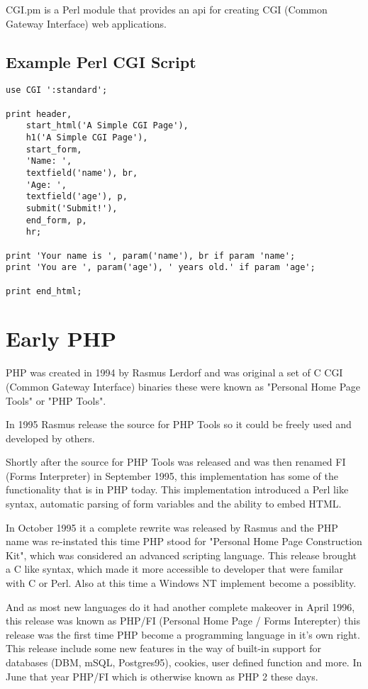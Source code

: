 \documentclass{book}
\begin{document}
CGI.pm is a Perl module that provides an api for creating CGI (Common Gateway Interface) web applications.

\subsection{Example Perl CGI Script}
\begin{lstlisting}
use CGI ':standard';
 
print header,
    start_html('A Simple CGI Page'),
    h1('A Simple CGI Page'),
    start_form,
    'Name: ',
    textfield('name'), br,
    'Age: ',
    textfield('age'), p,
    submit('Submit!'),
    end_form, p,
    hr;
 
print 'Your name is ', param('name'), br if param 'name';
print 'You are ', param('age'), ' years old.' if param 'age';
 
print end_html;

\end{lstlisting}

\section{Early PHP}
PHP was created in 1994 by Rasmus Lerdorf and was original a set of C CGI (Common Gateway Interface) binaries these were known as "Personal Home Page Tools" or "PHP Tools".

In 1995 Rasmus release the source for PHP Tools so it could be freely used and developed by others.

Shortly after the source for PHP Tools was released and was then renamed FI (Forms Interpreter) in September 1995, this implementation has some of the functionality that is in PHP today. This implementation introduced a Perl like syntax, automatic parsing of form variables and the ability to embed HTML.

In October 1995 it a complete rewrite was released by Rasmus and the PHP name was re-instated this time PHP stood for "Personal Home Page Construction Kit", which was considered an advanced scripting language. This release brought a C like syntax, which made it more accessible to developer that were familar with C or Perl. Also at this time a Windows NT implement become a possiblity.

And as most new languages do it had another complete makeover in April 1996, this release was known as PHP/FI (Personal Home Page / Forms Interepter) this release was the first time PHP become a programming language in it's own right. This release include some new features in the way of built-in support for databases (DBM, mSQL, Postgres95), cookies, user defined function and more. In June that year PHP/FI which is otherwise known as PHP 2 these days.
\end{document}
